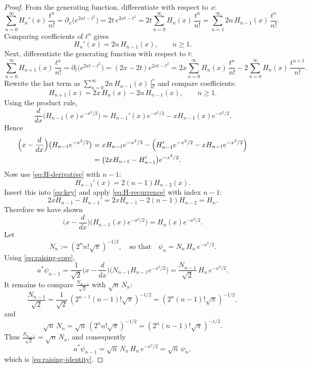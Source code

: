 \documentclass[11pt]{article}
\theoremstyle{remark}
\numberwithin{equation}{section}
\begin{document}
\begin{proof}
From the generating function, differentiate with respect to $x$:
\[
\sum_{n=0}^\infty H_n'(x)\,\frac{t^n}{n!}
=\partial_x\big(e^{2xt-t^2}\big)=2t\,e^{2xt-t^2}
=2t\sum_{n=0}^\infty H_n(x)\,\frac{t^n}{n!}
=\sum_{n=1}^\infty 2n\,H_{n-1}(x)\,\frac{t^n}{n!}.
\]
Comparing coefficients of $t^n$ gives
\begin{equation}\label{eq:H-derivative}
H_n'(x)=2n\,H_{n-1}(x),\qquad n\ge 1.
\end{equation}
Next, differentiate the generating function with respect to $t$:
\[
\sum_{n=0}^\infty H_{n+1}(x)\,\frac{t^n}{n!}
=\partial_t\big(e^{2xt-t^2}\big)=(2x-2t)e^{2xt-t^2}
=2x\sum_{n=0}^\infty H_n(x)\,\frac{t^n}{n!}
-2\sum_{n=0}^\infty H_n(x)\,\frac{t^{n+1}}{n!}.
\]
Rewrite the last term as $\sum_{n=0}^\infty 2n\,H_{n-1}(x)\,\frac{t^n}{n!}$ and compare coefficients:
\begin{equation}\label{eq:H-recurrence}
H_{n+1}(x)=2x\,H_n(x)-2n\,H_{n-1}(x),\qquad n\ge 1.
\end{equation}
Using the product rule,
\[
\frac{d}{dx}\big(H_{n-1}(x)e^{-x^2/2}\big)
=H_{n-1}'(x)e^{-x^2/2}-xH_{n-1}(x)e^{-x^2/2}.
\]
Hence
\begin{align}
\Big(x-\frac{d}{dx}\Big)\big(H_{n-1}e^{-x^2/2}\big)
&=xH_{n-1}e^{-x^2/2}-\Big(H_{n-1}'e^{-x^2/2}-xH_{n-1}e^{-x^2/2}\Big)\notag\\
&=\big(2xH_{n-1}-H_{n-1}'\big)e^{-x^2/2}. \label{eq:key}
\end{align}
Now use \eqref{eq:H-derivative} with $n-1$:
\[
H_{n-1}'(x)=2(n-1)H_{n-2}(x).
\]
Insert this into \eqref{eq:key} and apply \eqref{eq:H-recurrence} with index $n-1$:
\[
2xH_{n-1}-H_{n-1}'
=2xH_{n-1}-2(n-1)H_{n-2}
=H_n.
\]
Therefore we have shown 
\begin{equation}\label{eq:raising-core}
\Big(x-\frac{d}{dx}\Big)\big(H_{n-1}(x)e^{-x^2/2}\big)=H_n(x)e^{-x^2/2}.
\end{equation}
Let
\[
N_n:=(2^n n!\sqrt\pi)^{-1/2},
\quad\text{so that}\quad
\psi_n=N_n\,H_n\,e^{-x^2/2}.
\]
Using \eqref{eq:raising-core},
\[
a^\ast\psi_{n-1}
=\frac{1}{\sqrt2}\Big(x-\frac{d}{dx}\Big)\big(N_{n-1}H_{n-1}e^{-x^2/2}\big)
=\frac{N_{n-1}}{\sqrt2}\,H_n\,e^{-x^2/2}.
\]
It remains to compare $\frac{N_{n-1}}{\sqrt2}$ with $\sqrt n\,N_n$:
\[
\frac{N_{n-1}}{\sqrt2}
=\frac{1}{\sqrt2}\,(2^{n-1}(n-1)!\sqrt\pi)^{-1/2}
=(2^n (n-1)!\sqrt\pi)^{-1/2},
\]
and
\[
\sqrt n\,N_n
=\sqrt n\,(2^n n!\sqrt\pi)^{-1/2}
=(2^n (n-1)!\sqrt\pi)^{-1/2}.
\]
Thus $\frac{N_{n-1}}{\sqrt2}=\sqrt n\,N_n$, and consequently
\[
a^\ast\psi_{n-1}=\sqrt n\,N_n\,H_n\,e^{-x^2/2}=\sqrt n\,\psi_n,
\]
which is \eqref{eq:raising-identity}.
\end{proof}
\end{document}

